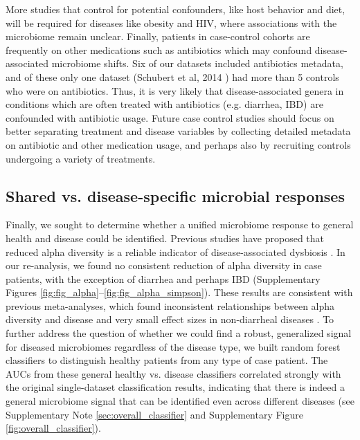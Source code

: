 More studies that control for potential confounders, like host behavior and diet, will be required for diseases like obesity and HIV, where associations with the microbiome remain unclear.
Finally, patients in case-control cohorts are frequently on other medications such as antibiotics which may confound disease-associated microbiome shifts.
Six of our datasets included antibiotics metadata, and of these only one dataset (Schubert et al, 2014 \cite{cdi-schubert}) had more than 5 controls who were on antibiotics.
Thus, it is very likely that disease-associated genera in conditions which are often treated with antibiotics (e.g. diarrhea, IBD) are confounded with antibiotic usage.
Future case control studies should focus on better separating treatment and disease variables by collecting detailed metadata on antibiotic and other medication usage, and perhaps also by recruiting controls undergoing a variety of treatments.

\subsection{Shared vs. disease-specific microbial responses}

Finally, we sought to determine whether a unified microbiome response to general health and disease could be identified.
Previous studies have proposed that reduced alpha diversity is a reliable indicator of disease-associated dysbiosis \cite{cdi-vincent,ob-gordon,mosca2016gut}.
In our re-analysis, we found no consistent reduction of alpha diversity in case patients, with the exception of diarrhea and perhaps IBD (Supplementary Figures \ref{fig:fig_alpha}--\ref{fig:fig_alpha_simpson}).
These results are consistent with previous meta-analyses, which found inconsistent relationships between alpha diversity and disease and very small effect sizes in non-diarrheal diseases \cite{walters2014meta, Sze07092016}.
To further address the question of whether we could find a robust, generalized signal for diseased microbiomes regardless of the disease type, we built random forest classifiers to distinguish healthy patients from any type of case patient.
The AUCs from these general healthy vs. disease classifiers correlated strongly with the original single-dataset classification results, indicating that there is indeed a general microbiome signal that can be identified even across different diseases (see Supplementary Note \ref{sec:overall_classifier} and Supplementary Figure \ref{fig:overall_classifier}).

